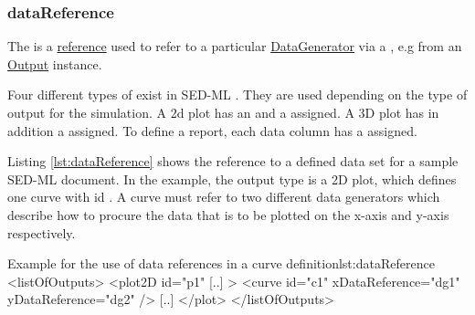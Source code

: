 \subsubsection{dataReference}
\label{sec:dataReference}
The  is a \hyperref[sec:reference]{reference} used to refer to a particular \hyperref[class:dataGenerator]{DataGenerator}
via a \hyperref[type:sidref]{}, e.g from an \hyperref[class:output]{Output} instance.

Four different types of  exist in SED-ML \currentLV. They are used depending on the type of output for the simulation. A 2d plot has an \hyperref[sec:xDataReference]{} and a \hyperref[sec:yDataReference]{} assigned. A 3D plot has in addition a \hyperref[sec:zDataReference]{} assigned. To define a report, each data column has a \hyperref[sec:dataReference1]{} assigned.

Listing \ref{lst:dataReference} shows the reference to a defined data set for a sample SED-ML document. In the example, the output type is a 2D plot, which defines one curve with id . A curve must refer to two different data generators which describe how to procure the data that is to be plotted on the x-axis and y-axis respectively. 

\begin{myXmlLst}{Example for the use of data references in a curve definition}{lst:dataReference}
<listOfOutputs>
	<plot2D id="p1" [..] >
    		<curve id="c1" xDataReference="dg1" yDataReference="dg2" />
		[..]
	</plot>
</listOfOutputs>
\end{myXmlLst}
